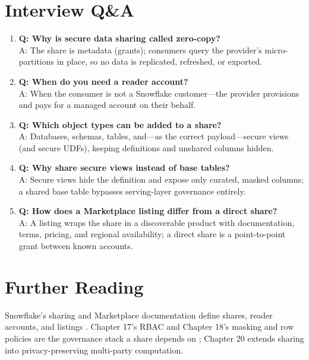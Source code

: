\section{Interview Q\&A}
\begin{enumerate}
    \item \textbf{Q: Why is secure data sharing called zero-copy?}\\
    A: The share is metadata (grants); consumers query the provider's micro-partitions in place, so no data is replicated, refreshed, or exported.
    \item \textbf{Q: When do you need a reader account?}\\
    A: When the consumer is not a Snowflake customer---the provider provisions and pays for a managed account on their behalf.
    \item \textbf{Q: Which object types can be added to a share?}\\
    A: Databases, schemas, tables, and---as the correct payload---secure views (and secure UDFs), keeping definitions and unshared columns hidden.
    \item \textbf{Q: Why share secure views instead of base tables?}\\
    A: Secure views hide the definition and expose only curated, masked columns; a shared base table bypasses serving-layer governance entirely.
    \item \textbf{Q: How does a Marketplace listing differ from a direct share?}\\
    A: A listing wraps the share in a discoverable product with documentation, terms, pricing, and regional availability; a direct share is a point-to-point grant between known accounts.
\end{enumerate}

\section{Further Reading}
Snowflake's sharing and Marketplace documentation define shares, reader accounts, and listings \cite{snowflakeDataSharingDocs,snowflakeMarketplaceDocs}. Chapter 17's RBAC and Chapter 18's masking and row policies are the governance stack a share depends on \cite{snowflakeAccessControlDocs,snowflakeMaskingDocs}; Chapter 20 extends sharing into privacy-preserving multi-party computation.

